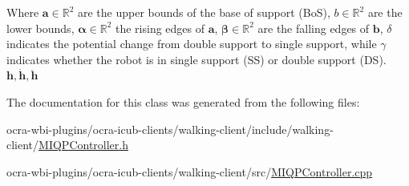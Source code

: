 \-Where $\mathbf{a} \in \mathbb{R}^2$ are the upper bounds of the base of support (\-Bo\-S), $b \in \mathbb{R}^2$ are the lower bounds, $\mathbf{\alpha} \in \mathbb{R}^2$ the rising edges of $\mathbf{a}$, $\mathbf{\beta} \in \mathbb{R}^2$ are the falling edges of $\mathbf{b}$, $\delta$ indicates the potential change from double support to single support, while $\gamma$ indicates whether the robot is in single support (\-S\-S) or double support (\-D\-S). $\mathbf{h}, \dot{\mathbf{h}}, \ddot{\mathbf{h}}$ 

\-The documentation for this class was generated from the following files\-:\begin{DoxyCompactItemize}
\item 
ocra-\/wbi-\/plugins/ocra-\/icub-\/clients/walking-\/client/include/walking-\/client/\hyperlink{MIQPController_8h}{\-M\-I\-Q\-P\-Controller.\-h}\item 
ocra-\/wbi-\/plugins/ocra-\/icub-\/clients/walking-\/client/src/\hyperlink{MIQPController_8cpp}{\-M\-I\-Q\-P\-Controller.\-cpp}\end{DoxyCompactItemize}
